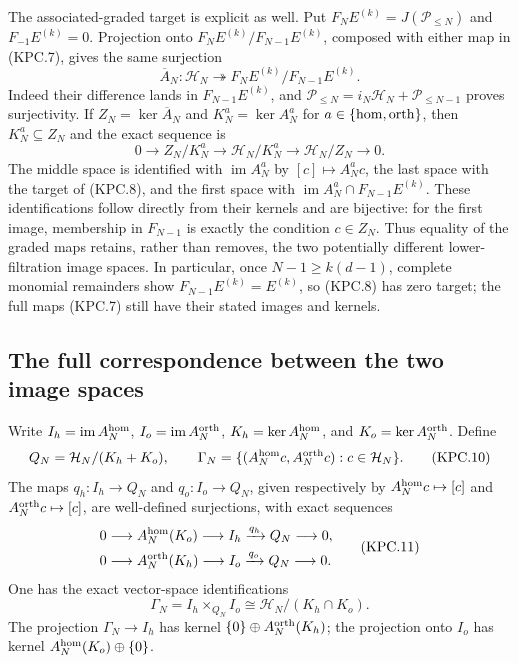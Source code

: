 The associated-graded target is explicit as well.  Put
\(F_NE^{(k)}=J(\mathcal P_{\le N})\) and \(F_{-1}E^{(k)}=0\).
Projection onto \(F_NE^{(k)}/F_{N-1}E^{(k)}\), composed
with either map in (KPC.7), gives the same surjection
\[
 \overline A_N:\mathcal H_N\twoheadrightarrow
                  F_NE^{(k)}/F_{N-1}E^{(k)}.
 \tag{KPC.8}
\]
Indeed their difference lands in \(F_{N-1}E^{(k)}\), and
\(\mathcal P_{\le N}=i_N\mathcal H_N+
\mathcal P_{\le N-1}\) proves surjectivity.  If
\(Z_N=\ker\overline A_N\) and
\(K_N^a=\ker A_N^a\) for \(a\in\{{\rm hom},{\rm orth}\}\),
then \(K_N^a\subseteq Z_N\) and the exact sequence is
\[
 0\longrightarrow Z_N/K_N^a
  \longrightarrow\mathcal H_N/K_N^a
  \longrightarrow\mathcal H_N/Z_N\longrightarrow0.
 \tag{KPC.9}
\]
The middle space is identified with \(\operatorname{im}A_N^a\)
by \([c]\mapsto A_N^a c\), the last space with the target
of (KPC.8), and the first space with
\(\operatorname{im}A_N^a\cap F_{N-1}E^{(k)}\).
These identifications follow directly from their kernels and are
bijective: for the first image, membership in \(F_{N-1}\)
is exactly the condition \(c\in Z_N\).  Thus equality of
the graded maps retains, rather than removes, the two potentially
different lower-filtration image spaces.  In particular, once
\(N-1\ge k(d-1)\), complete monomial remainders show
\(F_{N-1}E^{(k)}=E^{(k)}\), so (KPC.8) has zero target;
the full maps (KPC.7) still have their stated images and kernels.

\subsection{The full correspondence between the two image spaces}

\begin{theorem}
Write \(I_h=\operatorname{im}A_N^{\rm hom}\),
\(I_o=\operatorname{im}A_N^{\rm orth}\),
\(K_h=\ker A_N^{\rm hom}\), and
\(K_o=\ker A_N^{\rm orth}\).  Define
\[
 Q_N=\mathcal H_N/(K_h+K_o),\qquad
 \Gamma_N=\{(A_N^{\rm hom}c,A_N^{\rm orth}c):c\in\mathcal H_N\}.
 \tag{KPC.10}
\]
The maps \(q_h:I_h\to Q_N\) and \(q_o:I_o\to Q_N\),
given respectively by \(A_N^{\rm hom}c\mapsto[c]\) and
\(A_N^{\rm orth}c\mapsto[c]\), are well-defined
surjections, with exact sequences
\[
 \begin{split}
 0&\longrightarrow A_N^{\rm hom}(K_o)
       \longrightarrow I_h\xrightarrow{q_h}Q_N\longrightarrow0,\\
 0&\longrightarrow A_N^{\rm orth}(K_h)
       \longrightarrow I_o\xrightarrow{q_o}Q_N\longrightarrow0.
 \end{split}                                                    \tag{KPC.11}
\]
One has the exact vector-space identifications
\[
 \boxed{\Gamma_N=I_h\mathbin{\times}_{Q_N}I_o
       \cong\mathcal H_N/(K_h\cap K_o).}
 \tag{KPC.12}
\]
The projection \(\Gamma_N\to I_h\) has kernel
\(\{0\}\oplus A_N^{\rm orth}(K_h)\); the projection
onto \(I_o\) has kernel
\(A_N^{\rm hom}(K_o)\oplus\{0\}\).
\end{theorem}

